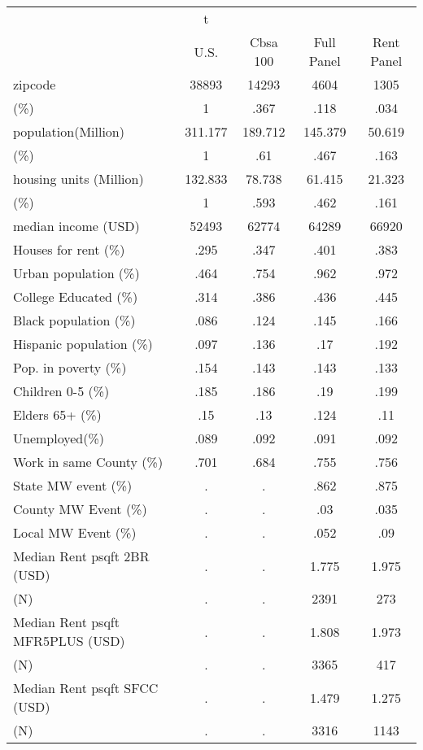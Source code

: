 \begin{tabular}{l*{4}{c}}
\hline\hline
            &           t&            &            &            \\
            &        U.S.&    Cbsa 100&  Full Panel&  Rent Panel\\
\hline
zipcode     &       38893&       14293&        4604&        1305\\
(\%)        &           1&        .367&        .118&        .034\\
population(Million)&     311.177&     189.712&     145.379&      50.619\\
(\%)        &           1&         .61&        .467&        .163\\
housing units (Million)&     132.833&      78.738&      61.415&      21.323\\
(\%)        &           1&        .593&        .462&        .161\\
median income (USD)&       52493&       62774&       64289&       66920\\
Houses for rent (\%)&        .295&        .347&        .401&        .383\\
Urban population (\%)&        .464&        .754&        .962&        .972\\
College Educated (\%)&        .314&        .386&        .436&        .445\\
Black population (\%)&        .086&        .124&        .145&        .166\\
Hispanic population (\%)&        .097&        .136&         .17&        .192\\
Pop. in poverty (\%)&        .154&        .143&        .143&        .133\\
Children 0-5 (\%)&        .185&        .186&         .19&        .199\\
Elders 65+ (\%)&         .15&         .13&        .124&         .11\\
Unemployed(\%)&        .089&        .092&        .091&        .092\\
Work in same County (\%)&        .701&        .684&        .755&        .756\\
State MW event (\%)&           .&           .&        .862&        .875\\
County MW Event (\%)&           .&           .&         .03&        .035\\
Local MW Event (\%)&           .&           .&        .052&         .09\\
Median Rent psqft 2BR (USD)&           .&           .&       1.775&       1.975\\
(N)         &           .&           .&        2391&         273\\
Median Rent psqft MFR5PLUS (USD)&           .&           .&       1.808&       1.973\\
(N)         &           .&           .&        3365&         417\\
Median Rent psqft SFCC (USD)&           .&           .&       1.479&       1.275\\
(N)         &           .&           .&        3316&        1143\\
\hline\hline
\end{tabular}
